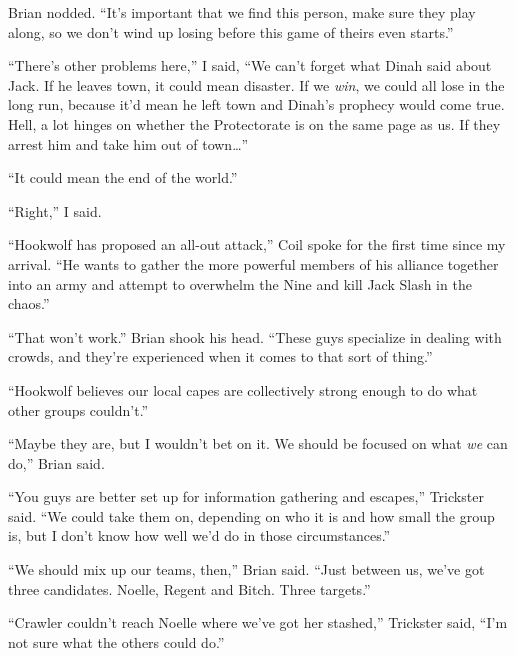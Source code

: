 Brian nodded.  ``It's important that we find this person, make sure they play along, so we don't wind up losing before this game of theirs even starts.''



``There's other problems here,'' I said, ``We can't forget what Dinah said about Jack.  If he leaves town, it could mean disaster.  If we \emph{win}, we could all lose in the long run, because it'd mean he left town and Dinah's prophecy would come true.  Hell, a lot hinges on whether the Protectorate is on the same page as us.  If they arrest him and take him out of town\ldots''



``It could mean the end of the world.''



``Right,'' I said.



``Hookwolf has proposed an all-out attack,'' Coil spoke for the first time since my arrival.  ``He wants to gather the more powerful members of his alliance together into an army and attempt to overwhelm the Nine and kill Jack Slash in the chaos.''



``That won't work.''  Brian shook his head.  ``These guys specialize in dealing with crowds, and they're experienced when it comes to that sort of thing.''



``Hookwolf believes our local capes are collectively strong enough to do what other groups couldn't.''



``Maybe they are, but I wouldn't bet on it.  We should be focused on what \emph{we} can do,'' Brian said.



``You guys are better set up for information gathering and escapes,'' Trickster said.  ``We could take them on, depending on who it is and how small the group is, but I don't know how well we'd do in those circumstances.''



``We should mix up our teams, then,'' Brian said.  ``Just between us, we've got three candidates.  Noelle, Regent and Bitch.  Three targets.''



``Crawler couldn't reach Noelle where we've got her stashed,'' Trickster said, ``I'm not sure what the others could do.''



